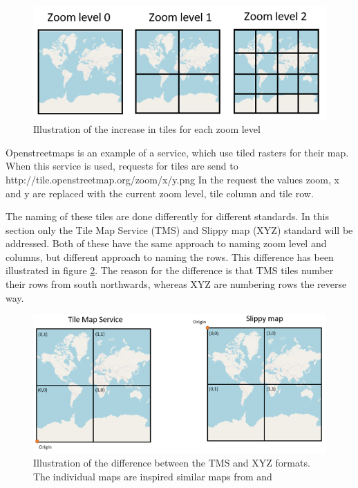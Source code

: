 \begin{figure} [H]
	\centering
	\includegraphics[width=1\textwidth]{Pictures/TilesPerZoomLevel}
	\caption{Illustration of the increase in tiles for each zoom level}
	\label{TilesPerZoomLevel}
\end{figure}

Openstreetmaps is an example of a service, which use tiled rasters for their map. When this service is used, requests for tiles are send to 
http://tile.openstreetmap.org/zoom/x/y.png
In the request the values zoom, x and y are replaced with the current zoom level, tile column and tile row.
\citep{SlippyMap}


The naming of these tiles are done differently for different standards. In this section only the Tile Map Service (TMS) and Slippy map (XYZ) standard will be addressed. Both of these have the same approach to naming zoom level and columns, but different approach to naming the rows. This difference has been illustrated in figure \ref{TMSXYZ}. The reason for the difference is that TMS tiles number their rows from south northwards, whereas XYZ are numbering rows the reverse way. %
\citep{TMS}

\begin{figure} [H]
	\centering
	\includegraphics[width=.8\textwidth]{Pictures/TMSXYZ}
	\caption{Illustration of the difference between the TMS and XYZ formats. The individual maps are inspired similar maps from \citet{Slippy101} and \citet{TMSnaming}}
	\label{TMSXYZ}
\end{figure}

%
